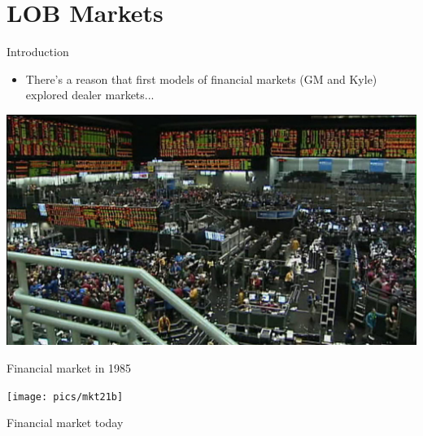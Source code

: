 \documentclass[english,10pt]{beamer}
\begin{document}
\section{LOB Markets}

\begin{frame}{Introduction}
	\begin{itemize}
		\item There's a reason that first models of financial markets (GM and Kyle) explored dealer markets...
	\end{itemize}
\end{frame}


\begin{frame}
	\centering
	\includegraphics[scale=0.5]{pics/mkt20}
	
	Financial market in 1985
\end{frame}


\begin{frame}
	\centering
	\texttt{[image: pics/mkt21b]}
	
	Financial market today
\end{frame}
\end{document}
